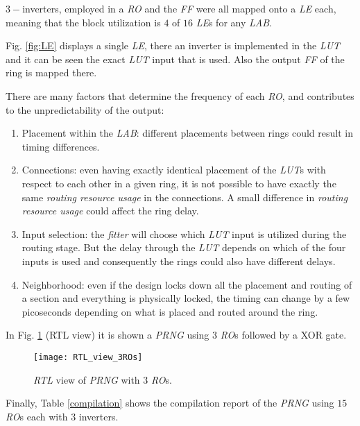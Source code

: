  $3-$inverters, employed in a \emph{RO} and the \emph{FF} were all mapped onto a  \emph{LE} each, meaning that the block
utilization is $4$ of $16$ \emph{LE}s for any \emph{LAB}.


Fig. \ref{fig:LE} displays a single \emph{LE}, there an inverter is
implemented in the \emph{LUT} and it can be seen the exact
\emph{LUT} input that is used. Also the output \emph{FF} of
the ring is mapped there.


There are many factors that determine the frequency of each
\emph{RO}, and contributes to the unpredictability of the output:
\begin{enumerate}
\item Placement within the \emph{LAB}: different placements between rings could result in timing differences.
\item Connections: even having exactly
identical placement of the \emph{LUT}s with respect to each other
in a given ring, it is not possible to have exactly the same
\emph{routing resource usage} in the connections. A small difference in
\emph{routing resource usage} could affect the ring delay.
\item Input selection:  the \emph{fitter} will choose which
\emph{LUT} input is utilized during the routing stage. But the delay through the \emph{LUT}
depends on which of the four inputs is used and consequently the rings could
also have different delays.
\item Neighborhood: even if the design locks down all the placement and routing of a
section  and everything is
physically locked, the timing can change by a few picoseconds
depending on what is placed and routed around the ring.\end{enumerate}
%
In Fig. \ref{fig:RTL3rings} (RTL view) it is shown a \emph{PRNG} using $3$ \emph{RO}s
followed by a XOR gate.

\begin{figure}
\begin{center}
\texttt{[image: RTL\_view\_3ROs]}
\caption{\emph{RTL} view of \emph{PRNG} with $3$ \emph{RO}s.}
\label{fig:RTL3rings}
\end{center}
\end{figure}


Finally, Table \ref{compilation} shows the compilation report of the \emph{PRNG}  using $15$ \emph{RO}s each with $3$ inverters.


